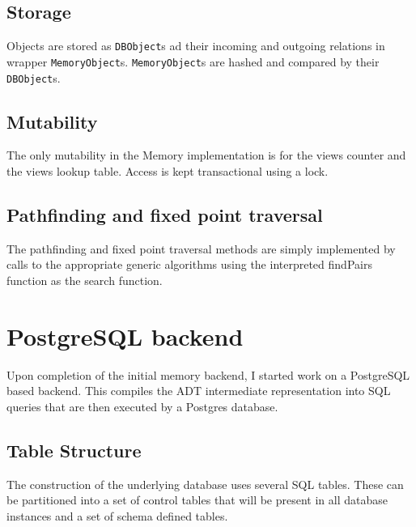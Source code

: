 \documentclass[12pt,a4paper,twoside,openright]{report}
\newcommand\codeName[1]{\texttt{#1}}
\begin{document}
	\subsection{Storage}
	Objects are stored as \codeName{DBObject}s ad their incoming and outgoing relations in wrapper \codeName{MemoryObject}s. \codeName{MemoryObject}s  are hashed and compared by their \codeName{DBObject}s.
	
	\subsection{Mutability}
	The only mutability in the Memory implementation is for the views counter and the views lookup table. Access is kept transactional using a lock.

	\subsection{Pathfinding and fixed point traversal}
	The pathfinding and fixed point traversal methods are simply implemented by calls to the appropriate generic algorithms using the interpreted findPairs function as the search function.


\section{PostgreSQL backend}
Upon completion of the initial memory backend, I started work on a PostgreSQL based backend. This compiles the ADT intermediate representation into SQL queries that are then executed by a Postgres database.

	\subsection{Table Structure}
	The construction of the underlying database uses several SQL tables. These can be partitioned into a set of control tables that will be present in all database instances and a set  of schema defined tables.
\end{document}
